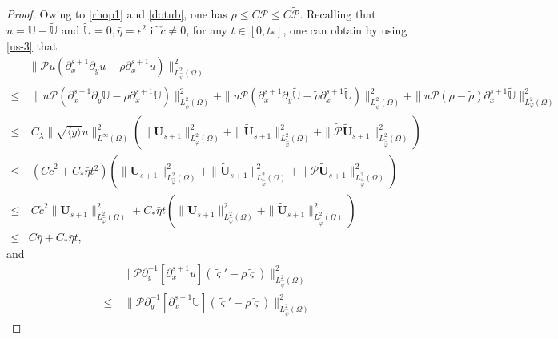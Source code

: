 \documentclass{amsart}
\numberwithin{equation}{section}
\newcommand\y{{{\langle y \rangle}}}
\begin{document}
\begin{proof}
Owing to \eqref{rhop1} and \eqref{dotub}, one has $\rho\leq C\mathcal{P}\leq C\tilde{\mathcal{P}}$.
Recalling that $u=\mathbb{U}-\tilde{\mathbb{U}}$ and $\tilde{\mathbb{U}}=0, \bar{\eta}=\epsilon^{2}$ if $\check{c}\neq0$, for any $t\in[0,t_{*}]$, one can obtain by using \eqref{us-3} that
\begin{align}\label{pm11}
&\|\mathcal{P}u(\partial_{x}^{s+1}\partial_{y}u-\rho\partial_{x}^{s+1}u)\|_{L_{\hat{\psi}}^{2}(\Omega)}^{2}\\
\leq&~\|u\mathcal{P}(\partial_{x}^{s+1}\partial_{y}\mathbb{U}-\rho\partial_{x}^{s+1}\mathbb{U})\|_{L_{\hat{\psi}}^{2}(\Omega)}^{2}
     +\|u\mathcal{P}(\partial_{x}^{s+1}\partial_{y}\tilde{\mathbb{U}}-\tilde{\rho}\partial_{x}^{s+1}\tilde{\mathbb{U}})\|_{L_{\hat{\psi}}^{2}(\Omega)}^{2}
     +\|u\mathcal{P}(\rho-\tilde{\rho})\partial_{x}^{s+1}\tilde{\mathbb{U}}\|_{L_{\varphi}^{2}(\Omega)}^{2}\nonumber\\
\leq&~C_{\lambda}\|\sqrt{\y}u\|_{L^{\infty}(\Omega)}^{2}\left(\|\mathbf{U}_{s+1}\|_{L_{\hat{\varphi}}^{2}(\Omega)}^{2}
                                                     +\|\tilde{\mathbf{U}}_{s+1}\|_{L_{\tilde{\hat{\varphi}}}^{2}(\Omega)}^{2}
                                                     +\|\tilde{\mathcal{P}}\tilde{\mathbf{U}}_{s+1}\|_{L_{\tilde{\hat{\varphi}}}^{2}(\Omega)}^{2}\right)\nonumber\\
\leq&~(C\check{c}^{2}+C_{*}\bar{\eta}t^{2})\left(\|\mathbf{U}_{s+1}\|_{L_{\hat{\varphi}}^{2}(\Omega)}^{2}
                                                     +\|\tilde{\mathbf{U}}_{s+1}\|_{L_{\tilde{\hat{\varphi}}}^{2}(\Omega)}^{2}
                                                     +\|\tilde{\mathcal{P}}\tilde{\mathbf{U}}_{s+1}\|_{L_{\tilde{\hat{\varphi}}}^{2}(\Omega)}^{2}\right)\nonumber\\
\leq&~C\check{c}^{2}\|\mathbf{U}_{s+1}\|_{L_{\hat{\varphi}}^{2}(\Omega)}^{2}
     +C_{*}\bar{\eta}t\left(\|\mathbf{U}_{s+1}\|_{L_{\hat{\varphi}}^{2}(\Omega)}^{2}
                                                     +\|\tilde{\mathbf{U}}_{s+1}\|_{L_{\tilde{\hat{\varphi}}}^{2}(\Omega)}^{2}\right)\nonumber\\
\leq& C\bar{\eta}+C_{*}\bar{\eta}t,\nonumber
\end{align}
and
\begin{align}\label{pm12}
&\|\mathcal{P}\partial_{y}^{-1}[\partial_{x}^{s+1}u](\tilde{\varsigma}'-\rho\tilde{\varsigma})\|_{L_{\hat{\psi}}^{2}(\Omega)}^{2}\\
\leq&~\|\mathcal{P}\partial_{y}^{-1}[\partial_{x}^{s+1}\mathbb{U}](\tilde{\varsigma}'-\rho\tilde{\varsigma})\|_{L_{\hat{\psi}}^{2}(\Omega)}^{2}

\end{align}
\end{proof}
\end{document}
